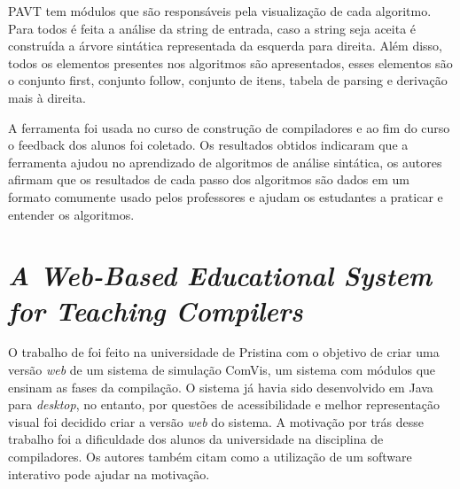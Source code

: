 PAVT tem módulos que são responsáveis pela visualização de cada algoritmo. Para todos é feita a análise da string de entrada, caso a string seja aceita é construída a árvore sintática representada da esquerda para direita. Além disso, todos os elementos presentes nos algoritmos são apresentados, esses elementos são o conjunto first, conjunto follow, conjunto de itens, tabela de parsing e derivação mais à direita.

A ferramenta foi usada no curso de construção de compiladores e ao fim do curso o feedback dos alunos foi coletado. Os resultados obtidos indicaram que a ferramenta ajudou no aprendizado de algoritmos de análise sintática, os autores afirmam que os resultados de cada passo dos algoritmos são dados em um formato comumente usado pelos professores e ajudam os estudantes a praticar e entender os algoritmos.



\section{\textit{A Web-Based Educational System for Teaching Compilers}}
O trabalho de \textcite{webbased} foi feito na universidade de Pristina com o objetivo de criar uma versão \textit{web} de um sistema de simulação ComVis, um sistema com módulos que ensinam as fases da compilação. O sistema já havia sido desenvolvido em Java para \textit{desktop}, no entanto, por questões de acessibilidade e melhor representação visual foi decidido criar a versão \textit{web} do sistema. A motivação por trás desse trabalho foi a dificuldade dos alunos da universidade na disciplina de compiladores. Os autores também citam como a utilização de um software interativo pode ajudar na motivação.

